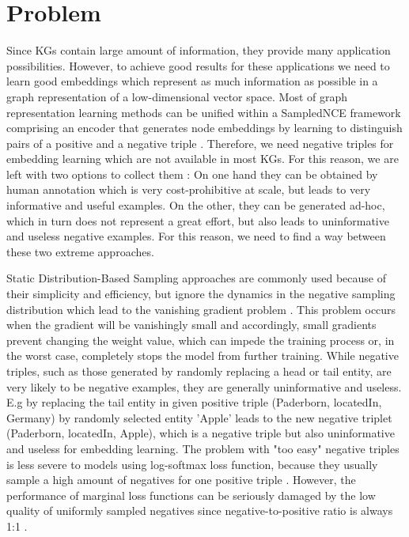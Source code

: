 \chapter{Problem}
\label{ch:problem}

Since \acp{KG} contain large amount of information, they provide many application possibilities.
However, to achieve good results for these applications we need to learn good embeddings which represent as much information as possible in a graph representation of a low-dimensional vector space.
Most of graph representation learning methods can be unified within a \ac{SampledNCE} framework comprising an encoder that generates node embeddings by learning to distinguish pairs of a positive and a negative triple \cite{MCNS}.
Therefore, we need negative triples for embedding learning which are not available in most \acp{KG}.
For this reason, we are left with two options to collect them \cite{safavi2021negater}: 
On one hand they can be obtained by human annotation which is very cost-prohibitive at scale, but leads to very informative and useful examples. 
On the other, they can be generated ad-hoc, which in turn does not represent a great effort, but also leads to uninformative and useless negative examples.
For this reason, we need to find a way between these two extreme approaches.

Static Distribution-Based Sampling approaches are commonly used because of their simplicity and efficiency, but ignore the dynamics in the negative sampling distribution which lead to 
the vanishing gradient problem \cite{qianunderstanding}.
This problem occurs when the gradient will be vanishingly small and accordingly, small gradients prevent changing the weight value, which can impede the training process or, in the worst case, completely stops the model from further training.
While negative triples, such as those generated by randomly replacing a head or tail entity, are very likely to be negative examples, they are generally uninformative and useless.
E.g by replacing the tail entity in given positive triple (Paderborn, locatedIn, Germany) by randomly selected entity 'Apple' leads to the new negative triplet (Paderborn, locatedIn, Apple), which is a negative triple but also uninformative and useless for embedding learning.
The problem with "too easy" negative triples is less severe to models using log-softmax loss function, because they usually sample a high amount of negatives for one positive triple \cite{cai2017kbgan}.
However, the performance of marginal loss functions can be seriously damaged by the low quality of uniformly sampled negatives since negative-to-positive ratio is always 1:1 \cite{cai2017kbgan}.

